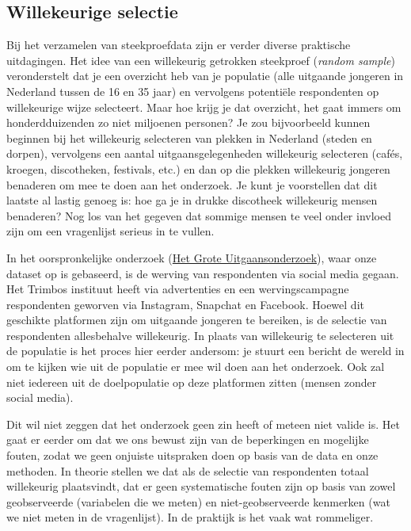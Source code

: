 \documentclass[
  letterpaper,
  DIV=11,
  numbers=noendperiod]{scrreprt}
\begin{document}
\subsection{Willekeurige selectie}\label{willekeurige-selectie}

Bij het verzamelen van steekproefdata zijn er verder diverse praktische
uitdagingen. Het idee van een willekeurig getrokken steekproef
(\emph{random sample}) veronderstelt dat je een overzicht heb van je
populatie (alle uitgaande jongeren in Nederland tussen de 16 en 35 jaar)
en vervolgens potentiële respondenten op willekeurige wijze selecteert.
Maar hoe krijg je dat overzicht, het gaat immers om honderdduizenden zo
niet miljoenen personen? Je zou bijvoorbeeld kunnen beginnen bij het
willekeurig selecteren van plekken in Nederland (steden en dorpen),
vervolgens een aantal uitgaansgelegenheden willekeurig selecteren
(cafés, kroegen, discotheken, festivals, etc.) en dan op die plekken
willekeurig jongeren benaderen om mee te doen aan het onderzoek. Je kunt
je voorstellen dat dit laatste al lastig genoeg is: hoe ga je in drukke
discotheek willekeurig mensen benaderen? Nog los van het gegeven dat
sommige mensen te veel onder invloed zijn om een vragenlijst serieus in
te vullen.

In het oorspronkelijke onderzoek
(\href{https://www.trimbos.nl/kennisbank/rapport-het-grote-uitgaansonderzoek-2023/}{Het
Grote Uitgaansonderzoek}), waar onze dataset op is gebaseerd, is de
werving van respondenten via social media gegaan. Het Trimbos instituut
heeft via advertenties en een wervingscampagne respondenten geworven via
Instagram, Snapchat en Facebook. Hoewel dit geschikte platformen zijn om
uitgaande jongeren te bereiken, is de selectie van respondenten
allesbehalve willekeurig. In plaats van willekeurig te selecteren uit de
populatie is het proces hier eerder andersom: je stuurt een bericht de
wereld in om te kijken wie uit de populatie er mee wil doen aan het
onderzoek. Ook zal niet iedereen uit de doelpopulatie op deze platformen
zitten (mensen zonder social media).

Dit wil niet zeggen dat het onderzoek geen zin heeft of meteen niet
valide is. Het gaat er eerder om dat we ons bewust zijn van de
beperkingen en mogelijke fouten, zodat we geen onjuiste uitspraken doen
op basis van de data en onze methoden. In theorie stellen we dat als de
selectie van respondenten totaal willekeurig plaatsvindt, dat er geen
systematische fouten zijn op basis van zowel geobserveerde (variabelen
die we meten) en niet-geobserveerde kenmerken (wat we niet meten in de
vragenlijst). In de praktijk is het vaak wat rommeliger.
\end{document}

